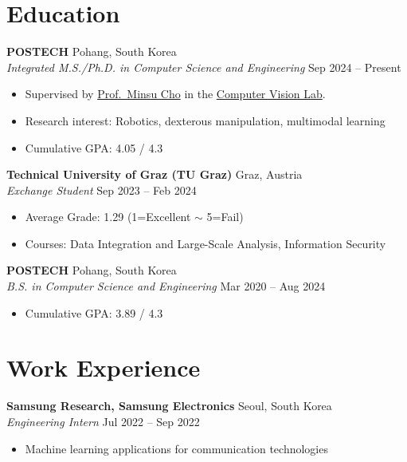 \documentclass[11pt, letterpaper]{article}
\newcommand{\entrytitle}[2]{%
  \textbf{#1} \hfill #2 \\}
\newcommand{\entrysub}[2]{%
  \textit{#1} \hfill #2}
\begin{document}
\section{Education}

\entrytitle{POSTECH}{Pohang, South Korea}
\entrysub{Integrated M.S./Ph.D. in Computer Science and Engineering}{Sep 2024 -- Present}
\begin{itemize}[leftmargin=1.5em, topsep=3pt, itemsep=1pt]
  \item Supervised by \href{http://cvlab.postech.ac.kr/~mcho/}{Prof.\ Minsu Cho}
        in the \href{http://cvlab.postech.ac.kr/}{Computer Vision Lab}.
  \item Research interest: Robotics, dexterous manipulation, multimodal learning
  \item Cumulative GPA: 4.05 / 4.3
\end{itemize}

\vspace{6pt}
\entrytitle{Technical University of Graz (TU Graz)}{Graz, Austria}
\entrysub{Exchange Student}{Sep 2023 -- Feb 2024}
\begin{itemize}[leftmargin=1.5em, topsep=3pt, itemsep=1pt]
  \item Average Grade: 1.29 \quad(1=Excellent $\sim$ 5=Fail)
  \item Courses: Data Integration and Large-Scale Analysis, Information Security
\end{itemize}

\vspace{6pt}
\entrytitle{POSTECH}{Pohang, South Korea}
\entrysub{B.S. in Computer Science and Engineering}{Mar 2020 -- Aug 2024}
\begin{itemize}[leftmargin=1.5em, topsep=3pt, itemsep=1pt]
  \item Cumulative GPA: 3.89 / 4.3
\end{itemize}

\section{Work Experience}

\entrytitle{Samsung Research, Samsung Electronics}{Seoul, South Korea}
\entrysub{Engineering Intern}{Jul 2022 -- Sep 2022}
\begin{itemize}[leftmargin=1.5em, topsep=3pt, itemsep=1pt]
  \item Machine learning applications for communication technologies
\end{itemize}
\end{document}
